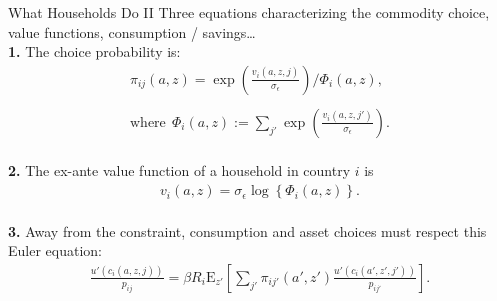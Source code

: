 \documentclass[9pt,pdftex,aspectratio=1610]{beamer}
\theoremstyle{definition}
\begin{document}
\begin{frame}[t]{What Households Do II}
Three equations characterizing the commodity choice, value functions, consumption / savings\ldots\\
\smallskip
\textbf{1.} The choice probability is:
\begin{align*}
\pi_{ij}(a, z) = \exp \left( \frac{ v_{i}(a, z, j) }{\sigma_{\epsilon}} \right) \Bigg / \Phi_{i}(a,z) ,\\
\\
\mbox{where} \ \ \Phi_{i}(a,z) := \sum_{j'} \exp \left( \frac{ v_{i}(a, z, j') }{\sigma_{\epsilon}}  \right).
\end{align*}\\
\bigskip
\textbf{2.} The ex-ante value function of a household in country $i$ is
\begin{align*}
v_i(a, z) = \sigma_{\epsilon} \log \left\{ \Phi_{i}(a,z)  \right\}.
\end{align*}\\
\bigskip
\textbf{3.} Away from the constraint, consumption and asset choices must respect this Euler equation:
\begin{align*}
\frac{u'(c_{i}(a, z, j))}{p_{ij}} = \beta R_{i} \mathrm{E}_{z'} \left[ \sum_{j'} \pi_{ij'}(a', z') \frac{u'(c_{i}(a', z', j'))}{p_{ij'}} \right].
\end{align*}
\end{frame}
\end{document}
